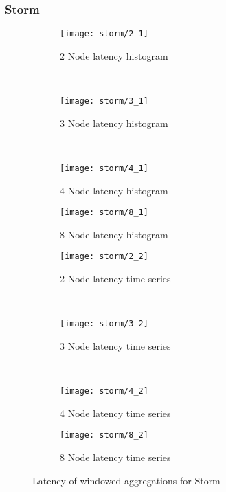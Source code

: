 \subsubsection{Storm}


\begin{figure*}
    \centering
    \begin{subfigure}[b]{0.49\textwidth}
        \texttt{[image: storm/2\_1]}
        \caption{2 Node latency histogram}
        \label{fig_no_queue}
    \end{subfigure}
    ~ %
    \begin{subfigure}[b]{0.49\textwidth}
        \texttt{[image: storm/3\_1]}
        \caption{3 Node latency histogram}
        \label{fig_yes_queue}
    \end{subfigure}
    ~ %
    \begin{subfigure}[b]{0.49\textwidth}
        \texttt{[image: storm/4\_1]}
        \caption{4 Node latency histogram}
        \label{fig_partial_queue}
    \end{subfigure}
        \begin{subfigure}[b]{0.49\textwidth}
        \texttt{[image: storm/8\_1]}
        \caption{8 Node latency histogram}
        \label{fig_partial_queue}
    \end{subfigure}


    \begin{subfigure}[b]{0.49\textwidth}
        \texttt{[image: storm/2\_2]}
        \caption{2 Node latency time series}
        \label{fig_no_queue}
    \end{subfigure}
    ~ %
    \begin{subfigure}[b]{0.49\textwidth}
        \texttt{[image: storm/3\_2]}
        \caption{3 Node latency time series}
        \label{fig_yes_queue}
    \end{subfigure}
    ~ %
    \begin{subfigure}[b]{0.49\textwidth}
        \texttt{[image: storm/4\_2]}
        \caption{4 Node latency time series}
        \label{fig_partial_queue}
    \end{subfigure}
        \begin{subfigure}[b]{0.49\textwidth}
        \texttt{[image: storm/8\_2]}
        \caption{8 Node latency time series}
        \label{fig_partial_queue}
    \end{subfigure}

    \label{fig_flink_agg_1}
        \caption{Latency of windowed aggregations for Storm}
\end{figure*}


